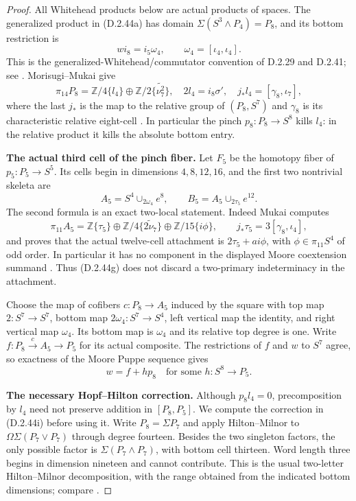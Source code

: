 \begin{proof}
All Whitehead products below are actual products of spaces.
The generalized product in (D.2.44a) has domain
$\Sigma(S^3\wedge P_4)=P_8$, and its bottom restriction is
\[
 wi_8=i_5\omega_4,\qquad
 \omega_4=[\iota_4,\iota_4].
 \tag{D.2.44e}
\]
This is the generalized-Whitehead/commutator convention of
D.2.29 and D.2.41; see
\cite[Definitions 2.2--2.3 and Theorem 2.4,
pp.~10--13]{EH5Arkowitz1962}.
Morisugi--Mukai give
\[
 \pi_{14}P_8=\mathbb Z/4\{l_4\}
       \oplus\mathbb Z/2\{\widetilde{\nu_7^2}\},
 \quad 2l_4=i_8\sigma',\quad
 j_*l_4=[\gamma_8,\iota_7],
 \tag{D.2.44f}
\]
where the last $j_*$ is the map to the relative group
of $(P_8,S^7)$ and $\gamma_8$ is its characteristic
relative eight-cell
\cite[Lemmas 2.7--2.8, p.~523]{EH5MorisugiMukai2000}.
In particular the pinch $p_8:P_8\to S^8$ kills $l_4$:
in the relative product it kills the absolute bottom entry.

\medskip\noindent
\textbf{The actual third cell of the pinch fiber.}
Let $F_5$ be the homotopy fiber of $p_5:P_5\to S^5$.
Its cells begin in dimensions $4,8,12,16$, and the first
two nontrivial skeleta are
\[
 A_5=S^4\cup_{2\omega_4}e^8,
 \qquad B_5=A_5\cup_{2\tau_5}e^{12}.
 \tag{D.2.44g}
\]
The second formula is an exact two-local statement.
Indeed Mukai computes
\[
 \pi_{11}A_5=\mathbb Z\{\tau_5\}
   \oplus\mathbb Z/4\{\widetilde{2\nu_7}\}
   \oplus\mathbb Z/15\{i\phi\},
 \qquad j_*\tau_5=3[\gamma_8,\iota_4],
 \tag{D.2.44h}
\]
and proves that the actual twelve-cell attachment is
$2\tau_5+a i\phi$, with $\phi\in\pi_{11}S^4$ of
odd order.  In particular it has no component in the displayed
Moore coextension summand
\cite[Lemma 4.1(iii), p.~69, and Lemma 5.1(i), p.~70]
{FGHMukai2001}.  Thus (D.2.44g) does not discard a
two-primary indeterminacy in the attachment.

Choose the map of cofibers $c:P_8\to A_5$ induced by the
square with top map $2:S^7\to S^7$, bottom map
$2\omega_4:S^7\to S^4$, left vertical map the identity,
and right vertical map $\omega_4$.  Its bottom map is
$\omega_4$ and its relative top degree is one.  Write
$f:P_8\xrightarrow{c}A_5\to P_5$ for its actual composite.
The restrictions of $f$ and $w$ to $S^7$ agree, so exactness
of the Moore Puppe sequence gives
\[
                    w=f+h p_8
 \quad\text{for some }h:S^8\longrightarrow P_5.
 \tag{D.2.44i}
\]

\medskip\noindent
\textbf{The necessary Hopf--Hilton correction.}
Although $p_8l_4=0$, precomposition by $l_4$ need not
preserve addition in $[P_8,P_5]$.  We compute the correction
in (D.2.44i) before using it.  Write $P_8=\Sigma P_7$
and apply Hilton--Milnor to
$\Omega\Sigma(P_7\vee P_7)$ through degree fourteen.
Besides the two singleton factors, the only possible factor
is $\Sigma(P_7\wedge P_7)$, with bottom cell thirteen.
Word length three begins in dimension nineteen and cannot
contribute.  This is the usual two-letter Hilton--Milnor
decomposition, with the range obtained from the indicated
bottom dimensions; compare
\cite[Proposition 2.2 and its proof]{I_CMN1987}.


\end{proof}
